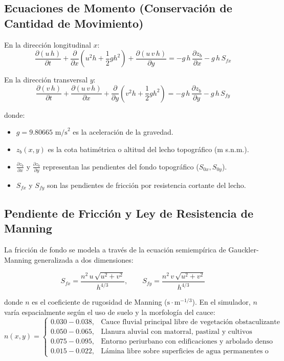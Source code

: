 \documentclass[11pt,a4paper]{article}
\begin{document}
\subsection{Ecuaciones de Momento (Conservación de Cantidad de Movimiento)}

En la dirección longitudinal $x$:
\begin{equation}
  \frac{\partial (u\,h)}{\partial t} + \frac{\partial}{\partial x}\left( u^2 h + \frac{1}{2} g h^2 \right) + \frac{\partial (u\,v\,h)}{\partial y} = -g\,h\,\frac{\partial z_b}{\partial x} - g\,h\,S_{fx}
\end{equation}

En la dirección transversal $y$:
\begin{equation}
  \frac{\partial (v\,h)}{\partial t} + \frac{\partial (u\,v\,h)}{\partial x} + \frac{\partial}{\partial y}\left( v^2 h + \frac{1}{2} g h^2 \right) = -g\,h\,\frac{\partial z_b}{\partial y} - g\,h\,S_{fy}
\end{equation}

donde:
\begin{itemize}
  \item $g = 9.80665\text{ m/s}^2$ es la aceleración de la gravedad.
  \item $z_b(x,y)$ es la cota batimétrica o altitud del lecho topográfico (m s.n.m.).
  \item $\frac{\partial z_b}{\partial x}$ y $\frac{\partial z_b}{\partial y}$ representan las pendientes del fondo topográfico ($S_{0x}, S_{0y}$).
  \item $S_{fx}$ y $S_{fy}$ son las pendientes de fricción por resistencia cortante del lecho.
\end{itemize}

\subsection{Pendiente de Fricción y Ley de Resistencia de Manning}

La fricción de fondo se modela a través de la ecuación semiempírica de Gauckler-Manning generalizada a dos dimensiones:

\begin{equation}
  S_{fx} = \frac{n^2 \, u \, \sqrt{u^2 + v^2}}{h^{4/3}}, \qquad S_{fy} = \frac{n^2 \, v \, \sqrt{u^2 + v^2}}{h^{4/3}}
\end{equation}

donde $n$ es el coeficiente de rugosidad de Manning ($\text{s}\cdot\text{m}^{-1/3}$). En el simulador, $n$ varía espacialmente según el uso de suelo y la morfología del cauce:
\begin{equation}
  n(x,y) =
  \begin{cases}
    0.030 - 0.038, & \text{Cauce fluvial principal libre de vegetación obstaculizante} \\
    0.050 - 0.065, & \text{Llanura aluvial con matorral, pastizal y cultivos} \\
    0.075 - 0.095, & \text{Entorno periurbano con edificaciones y arbolado denso} \\
    0.015 - 0.022, & \text{Lámina libre sobre superficies de agua permanentes o pavimentadas}
  \end{cases}
\end{equation}
\end{document}
